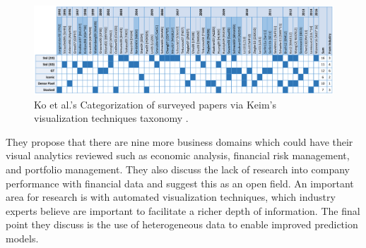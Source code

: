 \begin{figure}[t]
\begin{center}
\includegraphics[width=1\textwidth]{images/ko2016surveyFull}
\caption{Ko et al.'s Categorization of surveyed papers via Keim's visualization techniques taxonomy \cite{ko2016survey,keim2002information} .} \label{fig: ko2016survey}
\end{center}
\end{figure}

%

They propose that there are nine more business domains which could have their visual analytics reviewed such as economic analysis, financial risk management, and portfolio management. They also discuss the lack of research into company performance with financial data and suggest this as an open field. An important area for research is with automated visualization techniques, which industry experts believe are important to facilitate a richer depth of information. The final point they discuss is the use of heterogeneous data to enable improved prediction models.

